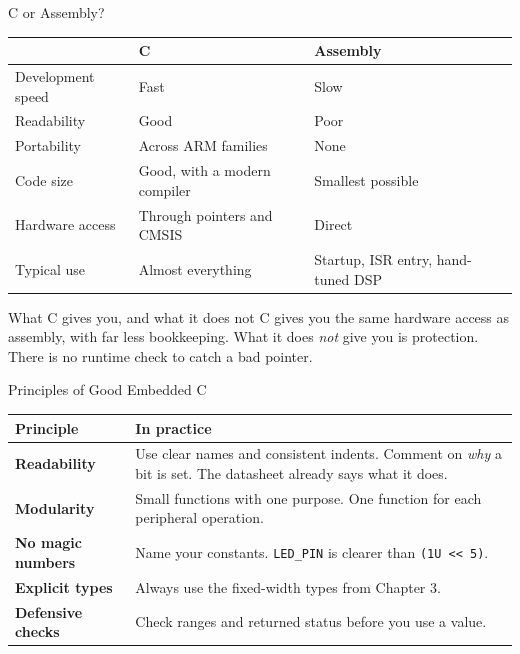 \documentclass[9pt,aspectratio=169,xcolor=table]{beamer}
\newcommand{\shl}{\texttt{<{}<}}
\begin{document}
\begin{frame}{C or Assembly?}
    \begin{center}
    {\small
    \striped
    \begin{tabular}{@{}l l l@{}}
        \toprule
         & \textbf{C} & \textbf{Assembly} \\
        \midrule
        Development speed & Fast & Slow \\
        Readability & Good & Poor \\
        Portability & Across ARM families & None \\
        Code size & Good, with a modern compiler & Smallest possible \\
        Hardware access & Through pointers and CMSIS & Direct \\
        Typical use & \alert{Almost everything} & Startup, ISR entry, hand-tuned DSP \\
        \bottomrule
    \end{tabular}}
    \end{center}

    \vspace{3mm}
    \begin{block}{What C gives you, and what it does not}
        C gives you the same hardware access as assembly, with far
        less bookkeeping. What it does \emph{not} give you is
        \alert{protection}. There is no runtime check to catch a bad
        pointer.
    \end{block}
\end{frame}

\begin{frame}{Principles of Good Embedded C}
    \begin{center}
    {\small
    \striped
    \begin{tabular}{@{}l R{.62\textwidth}@{}}
        \toprule
        \textbf{Principle} & \textbf{In practice} \\
        \midrule
        \textbf{Readability} & Use clear names and consistent indents. Comment on \emph{why} a bit is set. The datasheet already says what it does. \\
        \textbf{Modularity} & Small functions with one purpose. One function for each peripheral operation. \\
        \textbf{No magic numbers} & Name your constants. \texttt{LED\_PIN} is clearer than \texttt{(1U \shl\ 5)}. \\
        \textbf{Explicit types} & Always use the fixed-width types from Chapter 3. \\
        \textbf{Defensive checks} & Check ranges and returned status before you use a value. \\
        \bottomrule
    \end{tabular}}
    \end{center}
\end{frame}
\end{document}
